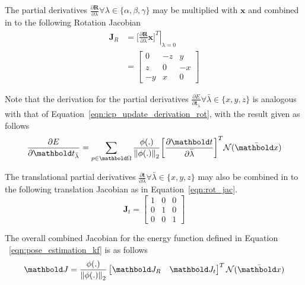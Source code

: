 The partial derivatives
\(\frac{\partial \bm{R}}{\partial \lambda} \forall \lambda \in \{\alpha, \beta, \gamma\}\) 
may be multiplied with \(\bm{x}\) and combined in to the following Rotation Jacobian
\begin{align}
  \label{eqn:rot_jac}
  \bm{J}_{R} & = \left. \bigg[
    \frac{\partial \bm{R}}{\partial \lambda} \bm{x}
    \bigg]^{T} \right\vert_{\lambda = 0} \\
  & =
  \begin{bmatrix}
    0 & -z & y \\
    z & 0 & -x \\
    -y & x & 0
  \end{bmatrix}
\end{align}

Note that the derivation for the partial derivatives
\(\frac{\partial E}{\partial \bm{t}_{\bar{\lambda}}} \forall \bar{\lambda} \in \{x, y, z\}\) 
is analogous with that of Equation~\ref{eqn:icp_update_derivation_rot}, with the result given as 
follows
\begin{equation}
  \label{eqn:icp_update_derivation_trans}
  \frac{\partial E}{\partial \bm{t}_{\bar{\lambda}}} =
  \sum_{p \in \bm{\Omega}}
  \frac{\phi(.)}{\norm{\phi(.)}}
  \bigg[ \frac{\partial \bm{t}}{\partial \bar{\lambda}}\bigg]^{T}
  \mathcal{N}(\bar{\bm{x}})
\end{equation}

The translational partial derivatives
\(\frac{\partial \bm{t}}{\partial \lambda} \forall \bar{\lambda} \in \{x, y, z\}\) may also 
be combined in to the following translation Jacobian as in Equation~\ref{eqn:rot_jac}.
\begin{equation}
  \label{eqn:trans_jac}
  \bm{J}_{t} =
  \begin{bmatrix}
    1 & 0 & 0 \\
    0 & 1 & 0 \\
    0 & 0 & 1
  \end{bmatrix}
\end{equation}

The overall combined Jacobian for the energy function defined in Equation
~\ref{eqn:pose_estimation_kf} is as follows
\begin{equation}
  \label{eqn:pose_jacobian}
  \bm{J} =
  \frac{\phi(.)}{\norm{\phi(.)}}
  \begin{bmatrix}
    \bm{J}_{R} & \bm{J}_{t}
  \end{bmatrix}^{T}
  \mathcal{N}(\bar{\bm{x}})
\end{equation}

